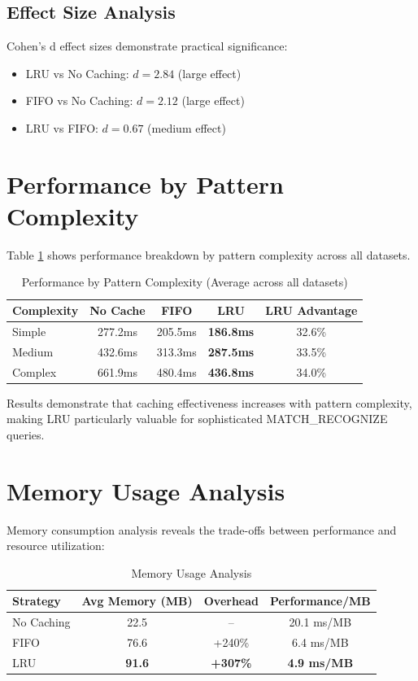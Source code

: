 \documentclass[conference]{IEEEtran}
\begin{document}
\subsection{Effect Size Analysis}

Cohen's d effect sizes demonstrate practical significance:
\begin{itemize}
\item LRU vs No Caching: $d = 2.84$ (large effect)
\item FIFO vs No Caching: $d = 2.12$ (large effect)
\item LRU vs FIFO: $d = 0.67$ (medium effect)
\end{itemize}

\section{Performance by Pattern Complexity}

Table \ref{tab:complexity_analysis} shows performance breakdown by pattern complexity across all datasets.

\begin{table}[H]
\centering
\caption{Performance by Pattern Complexity (Average across all datasets)}
\label{tab:complexity_analysis}
\begin{tabular}{@{}lcccc@{}}
\toprule
\textbf{Complexity} & \textbf{No Cache} & \textbf{FIFO} & \textbf{LRU} & \textbf{LRU Advantage} \\
\midrule
Simple & 277.2ms & 205.5ms & \textbf{186.8ms} & 32.6\% \\
Medium & 432.6ms & 313.3ms & \textbf{287.5ms} & 33.5\% \\
Complex & 661.9ms & 480.4ms & \textbf{436.8ms} & 34.0\% \\
\bottomrule
\end{tabular}
\end{table}

Results demonstrate that caching effectiveness increases with pattern complexity, making LRU particularly valuable for sophisticated MATCH\_RECOGNIZE queries.

\section{Memory Usage Analysis}

Memory consumption analysis reveals the trade-offs between performance and resource utilization:

\begin{table}[H]
\centering
\caption{Memory Usage Analysis}
\label{tab:memory_analysis}
\begin{tabular}{@{}lccc@{}}
\toprule
\textbf{Strategy} & \textbf{Avg Memory (MB)} & \textbf{Overhead} & \textbf{Performance/MB} \\
\midrule
No Caching & 22.5 & -- & 20.1 ms/MB \\
FIFO & 76.6 & +240\% & 6.4 ms/MB \\
LRU & \textbf{91.6} & \textbf{+307\%} & \textbf{4.9 ms/MB} \\
\bottomrule
\end{tabular}
\end{table}
\end{document}
